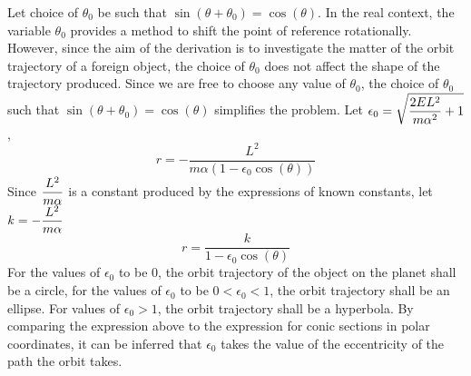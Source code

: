 \documentclass[a4paper, 12pt]{report}
\begin{document}
\begin{center}
Let choice of $\theta_0$ be such that $\sin{(\theta + \theta_0)} = \cos{(\theta)}$. In the real context, the variable $\theta_0$ provides a method to shift the point of reference rotationally. However, since the aim of the derivation is to investigate the matter of the orbit trajectory of a foreign object, the choice of $\theta_0$ does not affect the shape of the trajectory produced. Since we are free to choose any value of $\theta_0$, the choice of $\theta_0$ such that $\sin{(\theta + \theta_0)} = \cos{(\theta)}$ simplifies the problem. Let $\displaystyle{\epsilon_0 = \sqrt{\frac{2EL^2}{m \alpha^2}+1}}$,
$$r = -\frac{L^2}{m\alpha(1-\epsilon_0\cos{(\theta)})}$$
Since $\displaystyle{\frac{L^2}{m\alpha}}$ is a constant produced by the expressions of known constants, let $\displaystyle k = -\frac{L^2}{m\alpha}$
$$r=\frac{k}{1-\epsilon_0\cos{(\theta)}}$$
For the values of $\epsilon_0$ to be $0$, the orbit trajectory of the object on the planet shall be a circle, for the values of $\epsilon_0$ to be $0<\epsilon_0<1$, the orbit trajectory shall be an ellipse. For values of $\epsilon_0>1$, the orbit trajectory shall be a hyperbola. By comparing the expression above to the expression for conic sections in polar coordinates, it can be inferred that $\epsilon_0$ takes the value of the eccentricity of the path the orbit takes.

\end{center}
\end{document}
